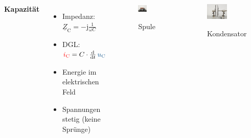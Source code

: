 \begin{frame}
{\begin{columns}
    \textbf{Kapazität} 
    \begin{itemize}
        \item Impedanz: $\underline{Z}_{\mathrm C} = -\mathrm{j}\frac{1}{\omega C}$
        \item DGL: $\eci{i_{\mathrm C}} = C \cdot \frac{\d}{\d t}\, \ecv{u_{\mathrm C}}$
        \item Energie im elektrischen Feld
        \item Spannungen stetig (keine Sprünge)
    \end{itemize}


    \begin{figure}[H]\centering
        \includegraphics[width=0.5\textwidth]{./Bilder/Spule.png}
        \par Spule
    \end{figure}
    \begin{figure}\centering
        \includegraphics[width=0.5\textwidth]{./Bilder/Kondensator.png}
        \par Kondensator
    \end{figure}
\end{columns}
}%
\end{frame}


